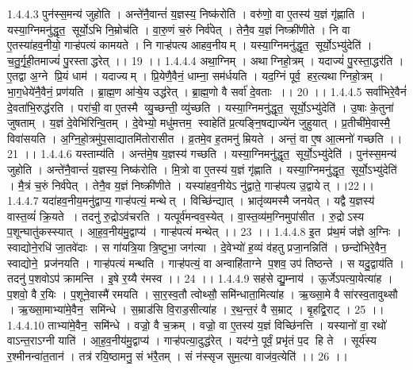 1.4.4.3
पुन॑स्स॒मन्य॑ जुहोति । अन्ते॑नै॒वान्तं॑ य॒ज्ञस्य॒ निष्क॑रोति । वरु॑णो॒ वा ए॒तस्य॑ य॒ज्ञं गृ॑ह्णाति । यस्या॒ग्निमनु॑द्धृत॒॒ सूर्यो॒ऽभि नि॒म्रोच॑ति । वा॒रु॒णं च॒रुं निर्व॑पेत् । तेनै॒व य॒ज्ञं निष्क्री॑णीते । नि वा ए॒तस्या॑हव॒नीयो॒ गाऱ्ह॑पत्यं कामयते । नि गाऱ्ह॑पत्य आहव॒नीयम् । यस्या॒ग्निमनु॑द्धृत॒॒ सूर्यो॒ऽभ्यु॑देति॑ । च॒तु॒र्गृ॒ही॒तमाज्यं॑ पु॒रस्ताद्धरेत् ।। 19 ।।
1.4.4.4
अथा॒ग्निम् । अथाग्निहो॒त्रम् । यदाज्यं॑ पु॒रस्ता॒द्धर॑ति । ए॒तद्वा अ॒ग्ने प्रि॒यं धाम॑ । यदाज्यम् । प्रि॒येणै॒वैनं॒ धाम्ना॒ सम॑र्धयति । यद॒ग्निं पूर्व॒॒ हर॒त्यथाग्निहो॒त्रम् । भा॒ग॒धेये॑नै॒वैनं॒ प्रण॑यति । ब्रा॒ह्म॒ण आ॑ऱ्षे॒य उद्ध॑रेत् । ब्रा॒ह्म॒णो वै सर्वा॑ दे॒वताः ।। 20 ।।
1.4.4.5
सर्वा॑भिरे॒वैनं॑ दे॒वता॑भि॒रुद्ध॑रति । परा॑ची॒ वा ए॒तस्मै व्यु॒च्छन्ती॒ व्यु॑च्छति । यस्या॒ग्निमनु॑द्धृत॒॒ सूर्यो॒ऽभ्यु॑देति॑ । उ॒षाः के॒तुना॑ जुषताम् । य॒ज्ञं दे॒वेभि॑रिन्वि॒तम् । दे॒वेभ्यो॒ मधु॑मत्तम॒॒ स्वाहेति॑ प्र॒त्यङ्नि॒षद्याज्ये॑न जुहुयात् । प्र॒तीची॑मे॒वास्मै॒ विवा॑सयति । अ॒ग्नि॒हो॒त्रमु॑प॒साद्यातमि॑तोरासीत । व्र॒तमे॒व ह॒तमनु॑ म्रियते । अन्तं॒ वा ए॒ष आ॒त्मनो॑ गच्छति ।। 21 ।।
1.4.4.6
यस्ताम्य॑ति । अन्त॑मे॒ष य॒ज्ञस्य॑ गच्छति । यस्या॒ग्निमनु॑द्धृत॒॒ सूर्यो॒ऽभ्यु॑देति॑ । पुन॑स्स॒मन्य॑ जुहोति । अन्ते॑नै॒वान्तं॑ य॒ज्ञस्य॒ निष्क॑रोति । मि॒त्रो वा ए॒तस्य॑ य॒ज्ञं गृ॑ह्णाति । यस्या॒ग्निमनु॑द्धृत॒॒ सूर्यो॒ऽभ्यु॑देति॑ । मै॒त्रं च॒रुं निर्व॑पेत् । तेनै॒व य॒ज्ञं निष्क्री॑णीते । यस्या॑हव॒नीयेऽ नु॑द्वाते॒ गाऱ्ह॑पत्य उ॒द्वायेत् ।।22।।
1.4.4.7
यदा॑हव॒नीय॒मनु॑द्वाप्य॒ गाऱ्ह॑पत्यं॒ मन्थेत् । विच्छि॑न्द्यात् । भ्रातृ॑व्यमस्मै जनयेत् । यद्वै य॒ज्ञस्य॑ वास्त॒व्यं॑ क्रि॒यते । तदनु॑ रु॒द्रोऽव॑चरति । यत्पूर्व॑मन्वव॒स्येत् । वा॒स्त॒व्य॑म॒ग्निमुपा॑सीत । रु॒द्रोऽस्य प॒शून्घातु॑कस्स्यात् । आ॒ह॒व॒नीय॑मु॒द्वाप्य॑ । गाऱ्ह॑पत्यं मन्थेत् ।। 23 ।।
1.4.4.8
इ॒त प्र॑थ॒मं ज॑ज्ञे अ॒ग्निः । स्वाद्योने॒रधि॑ जा॒तवे॑दाः । स गा॑यत्रि॒या त्रि॒ष्टुभा॒ जग॑त्या । दे॒वेभ्यो॑ ह॒व्यं व॑हतु प्रजा॒नन्निति॑ । छन्दो॑भिरे॒वैन॒॒ स्वाद्योने॒ प्रज॑नयति । गाऱ्ह॑पत्यं मन्थति । गाऱ्ह॑पत्यं॒ वा अन्वाहि॑ताग्ने प॒शव॒ उप॑ तिष्ठन्ते । स यदु॒द्वाय॑ति । तदनु॑ प॒शवोऽप॑ क्रामन्ति । इ॒षे र॒य्यै र॑मस्व ।। 24 ।।
1.4.4.9
सह॑से द्यु॒म्नाय॑ । ऊ॒र्जेऽपत्या॒येत्या॑ह । प॒शवो॒ वै र॒यिः । प॒शूने॒वास्मै॑ रमयति । सा॒र॒स्व॒तौ त्वोथ्सौ॒ समि॑न्धाता॒मित्या॑ह । ऋ॒ख्सा॒मे वै सा॑रस्व॒तावुथ्सौ । ऋ॒ख्सा॒माभ्या॑मे॒वैन॒॒ समि॑न्धे । स॒म्राड॑सि वि॒राड॒सीत्या॑ह । र॒थ॒न्त॒रं वै स॒म्राट् । बृ॒हद्वि॒राट् । 25 ।।
1.4.4.10
ताभ्या॑मे॒वैन॒॒ समि॑न्धे । वज्रो॒ वै च॒क्रम् । वज्रो॒ वा ए॒तस्य॑ य॒ज्ञं विच्छि॑नत्ति । यस्यानो॑ वा॒ रथो॑ वाऽन्त॒राऽग्नी याति॑ । आ॒ह॒व॒नीय॑मु॒द्वाप्य॑ । गाऱ्ह॑पत्या॒दुद्ध॑रेत् । यद॑ग्ने॒ पूर्वं॒ प्रभृ॑तं प॒द हि ते । सूर्य॑स्य र॒श्मीनन्वा॑त॒तान॑ । तत्र॑ रयि॒ष्ठामनु॒ सं भ॑रै॒तम् । सं न॑स्सृज सुम॒त्या वाज॑व॒त्येति॑ ।। 26 ।।
